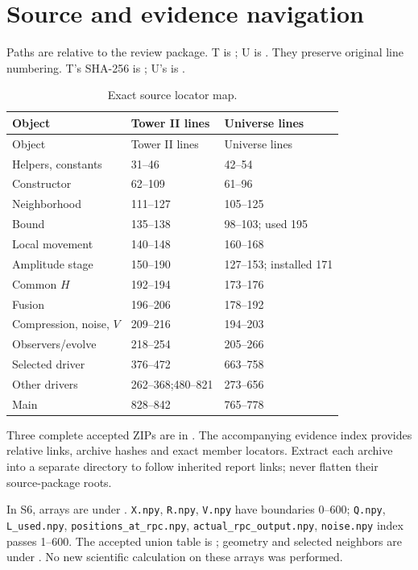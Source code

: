 \appendix
\section{Source and evidence navigation}\label{app:evidence}
Paths are relative to the review package. T is
\protect{};
U is
\protect{}.
They preserve original line numbering. T's SHA-256 is
\protect{};
U's is
\protect{}.

\begin{longtable}{P{31mm}P{49mm}P{68mm}}
\caption{Exact source locator map.}\\
\toprule Object & Tower II lines & Universe lines\\\midrule
\endfirsthead\toprule Object & Tower II lines & Universe lines\\\midrule\endhead
Helpers, constants & 31--46 & 42--54\\
Constructor & 62--109 & 61--96\\
Neighborhood & 111--127 & 105--125\\
Bound & 135--138 & 98--103; used 195\\
Local movement & 140--148 & 160--168\\
Amplitude stage & 150--190 & 127--153; installed 171\\
Common \(H\) & 192--194 & 173--176\\
Fusion & 196--206 & 178--192\\
Compression, noise, \(V\) & 209--216 & 194--203\\
Observers/evolve & 218--254 & 205--266\\
Selected driver & 376--472 & 663--758\\
Other drivers & 262--368;480--821 & 273--656\\
Main & 828--842 & 765--778\\
\bottomrule
\end{longtable}

Three complete accepted ZIPs are in \protect{}. The accompanying evidence index provides relative links, archive hashes and exact member locators. Extract each archive into a separate directory to follow inherited report links; never flatten their source-package roots.

In S6, arrays are under \protect{}.
\texttt{X.npy}, \texttt{R.npy}, \texttt{V.npy} have boundaries 0--600;
\texttt{Q.npy}, \texttt{L\_used.npy}, \texttt{positions\_at\_rpc.npy},
\texttt{actual\_rpc\_output.npy}, \texttt{noise.npy} index passes 1--600.
The accepted union table is \protect{};
geometry and selected neighbors are under \protect{}.
No new scientific calculation on these arrays was performed.

